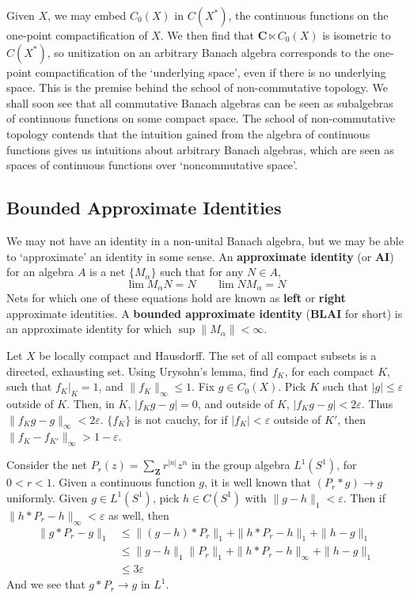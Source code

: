 Given $X$, we may embed $C_0(X)$ in $C(X^*)$, the continuous functions on the one-point compactification of $X$. We then find that $\mathbf{C} \ltimes C_0(X)$ is isometric to $C(X^*)$, so unitization on an arbitrary Banach algebra corresponds to the one-point compactification of the `underlying space', even if there is no underlying space. This is the premise behind the school of non-commutative topology. We shall soon see that all commutative Banach algebras can be seen as subalgebras of continuous functions on some compact space. The school of non-commutative topology contends that the intuition gained from the algebra of continuous functions gives us intuitions about arbitrary Banach algebras, which are seen as spaces of continuous functions over `noncommutative space'.

\subsection{Bounded Approximate Identities}

We may not have an identity in a non-unital Banach algebra, but we may be able to `approximate' an identity in some sense. An {\bf approximate identity} (or {\bf AI}) for an algebra $A$ is a net $\{ M_\alpha \}$ such that for any $N \in A$,
%
\[ \lim M_\alpha N = N\ \ \ \ \ \ \ \ \lim N M_\alpha = N \]
%
Nets for which one of these equations hold are known as {\bf left} or {\bf right} approximate identities. A {\bf bounded approximate identity} ({\bf BLAI} for short) is an approximate identity for which $\sup \| M_\alpha \| < \infty$.

\begin{example}
    Let $X$ be locally compact and Hausdorff. The set of all compact subsets is a directed, exhausting set. Using Urysohn's lemma, find $f_K$, for each compact $K$, such that $f_K |_K = 1$, and $\| f_K \|_\infty \leq 1$. Fix $g \in C_0(X)$. Pick $K$ such that $|g| \leq \varepsilon$ outside of $K$. Then, in $K$, $|f_K g - g| = 0$, and outside of $K$, $|f_K g - g| < 2 \varepsilon$. Thus $\| f_K g - g \|_\infty < 2 \varepsilon$. $\{ f_K \}$ is not cauchy, for if $|f_K| < \varepsilon$ outside of $K'$, then $\| f_K - f_{K'} \|_\infty > 1 - \varepsilon$.
\end{example}

\begin{example}
    Consider the net $P_r(z) = \sum_\mathbf{Z} r^{|n|} z^n$ in the group algebra $L^1(S^1)$, for $0 < r < 1$. Given a continuous function $g$, it is well known that $(P_r * g) \to g$ uniformly. Given $g \in L^1(S^1)$, pick $h \in C(S^1)$ with $\| g - h \|_1 < \varepsilon$. Then if $\| h * P_r - h \|_\infty < \varepsilon$ as well, then
    \begin{align*}
        \| g * P_r - g \|_1 &\leq \|(g - h) * P_r \|_1 + \| h * P_r - h \|_1 + \| h - g \|_1\\
        &\leq \|g - h\|_1 \| P_r \|_1 + \| h * P_r - h \|_\infty + \| h - g \|_1\\
        &\leq 3 \varepsilon
    \end{align*}
    And we see that $g * P_r \to g$ in $L^1$.
\end{example}

